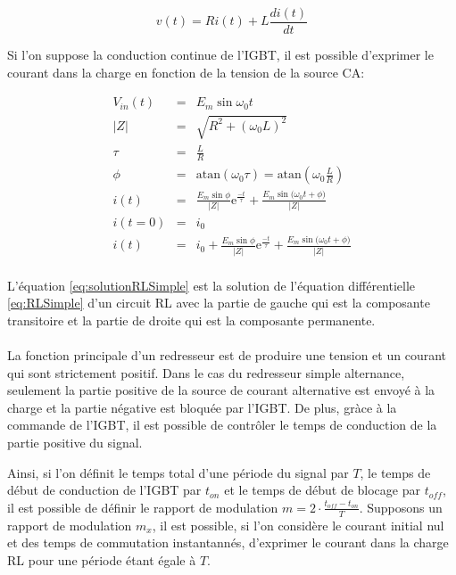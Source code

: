\begin{equation}
\label{eq:RLSimple}
v(t) = R i(t) + L \frac{d i(t)}{dt}
\end{equation}

Si l'on suppose la conduction continue de l'IGBT, il est possible d'exprimer le courant dans la charge en fonction de la tension de la source CA:

\begin{eqnarray}
V_{in}(t) &=& E_m\sin{\omega_0 t} \\
|Z| &=& \sqrt{R^2 + (\omega_0 L)^2} \\
\tau &=& \frac{L}{R}\\
\phi &=& \mbox{atan}(\omega_0 \tau) = \mbox{atan}(\omega_0 \frac{L}{R}) \\
\label{eq:solutionRLSimple} i(t) &=& \frac{E_m\sin{\phi}}{|Z|}\mbox{e}^{\frac{-t}{\tau}} + \frac{E_m\sin{(\omega_0 t + \phi})}{|Z|}\\
i(t=0) &=& i_0\\
i(t) &=& i_0  + \frac{E_m\sin{\phi}}{|Z|}\mbox{e}^{\frac{-t}{\tau}} + \frac{E_m\sin{(\omega_0 t + \phi})}{|Z|} \\
\end{eqnarray}

L'équation \ref{eq:solutionRLSimple} est la solution de l'équation différentielle \ref{eq:RLSimple} d'un circuit RL avec la partie de gauche qui est la composante transitoire et la partie de droite qui est la composante permanente. 

\paragraph{}
La fonction principale d'un redresseur est de produire une tension et un courant qui sont strictement positif. Dans le cas du redresseur simple alternance, seulement la partie positive de la source de courant alternative est envoyé à la charge et la partie négative est bloquée par l'IGBT. De plus, gràce à la commande de l'IGBT, il est possible de contrôler le temps de conduction de la partie positive du signal.

Ainsi, si l'on définit le temps total d'une période du signal par $T$, le temps de début de conduction de l'IGBT par $t_{on}$ et le temps de début de blocage par $t_{off}$, il est possible de définir le rapport de modulation $m = 2\cdot \frac{t_{off}-t_{on}}{T}$. Supposons un rapport de modulation $m_x$, il est possible, si l'on considère le courant initial nul et des temps de commutation instantannés, d'exprimer le courant dans la charge RL pour une période étant égale à $T$.

